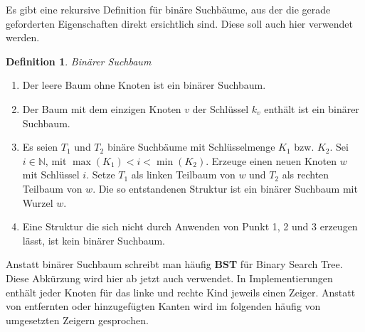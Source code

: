 \documentclass[a4paper,12pt]{article}
\begin{document}
\noindent Es gibt eine rekursive Definition für binäre Suchbäume, aus der die gerade geforderten Eigenschaften direkt ersichtlich sind.
Diese soll auch hier verwendet werden.\\ 


\newtheorem{defi}{Definition}[section]
\begin{defi}Binärer Suchbaum\end{defi}
\begin{enumerate}
	\item Der leere Baum ohne Knoten ist ein binärer Suchbaum.
	\item Der Baum mit dem einzigen Knoten $v$ der Schlüssel $k_v$ enthält ist ein binärer Suchbaum.
	\item Es seien $T_1$ und $T_2$ binäre Suchbäume mit Schlüsselmenge $K_1$ bzw. $K_2$. Sei $i \in \mathbb{N} $, mit $\max{(K_1)} < i < \min{(K_2)}$. Erzeuge einen neuen Knoten $w$ mit Schlüssel $i$. Setze $T_1$ als linken Teilbaum von $w$ und $T_2$ als rechten Teilbaum von $w$. Die so entstandenen Struktur ist ein binärer Suchbaum mit Wurzel $w$. 
	\item Eine Struktur die sich nicht durch Anwenden von Punkt 1, 2 und 3 erzeugen lässt, ist kein binärer Suchbaum.  
\end{enumerate}
	
\noindent Anstatt binärer Suchbaum schreibt man häufig \textbf{BST} für Binary Search Tree. Diese Abkürzung wird hier ab jetzt auch verwendet. In Implementierungen enthält jeder Knoten für das linke und rechte Kind jeweils einen Zeiger. Anstatt von entfernten oder hinzugefügten Kanten wird im folgenden häufig von umgesetzten Zeigern gesprochen. 	
\end{document}
